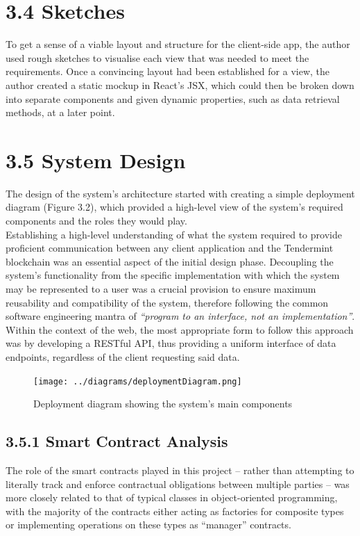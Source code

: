 \section{3.4 Sketches}\label{sketches}

To get a sense of a viable layout and structure for the client-side app,
the author used rough sketches to visualise each view that was needed to
meet the requirements. Once a convincing layout had been established for
a view, the author created a static mockup in React's JSX, which could
then be broken down into separate components and given dynamic
properties, such as data retrieval methods, at a later point.

\section{3.5 System Design}\label{system-design}

The design of the system's architecture started with creating a simple
deployment diagram (Figure 3.2), which provided a high-level view of
the system's required components and the roles they would play.\\
Establishing a high-level understanding of what the system required to
provide proficient communication between any client application and the
Tendermint blockchain was an essential aspect of the initial design
phase. Decoupling the system's functionality from the specific
implementation with which the system may be represented to a user was a
crucial provision to ensure maximum reusability and compatibility of the
system, therefore following the common software engineering mantra of
\emph{``program to an interface, not an implementation''}\cite{1programtointerface}.
Within the context of the web, the most appropriate form to follow this
approach was by developing a RESTful\cite{1rest} API, thus providing a
uniform interface of data endpoints, regardless of the client requesting
said data.

\begin{figure}[htbp]
\centering
\texttt{[image: ../diagrams/deploymentDiagram.png]}
\caption{Deployment diagram showing the system's main components}
\end{figure}

\subsection{3.5.1 Smart Contract
Analysis}\label{smart-contract-analysis}

The role of the smart contracts played in this project -- rather than
attempting to literally track and enforce contractual obligations
between multiple parties -- was more closely related to that of typical
classes in object-oriented programming, with the
majority of the contracts either acting as
factories\cite{gamma1995design} for composite types or implementing
operations on these types as ``manager'' contracts.

